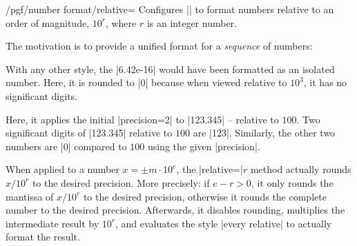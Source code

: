 \begin{keylist}{/pgf/number format/relative=}
	Configures |\pgfmathprintnumber| to format numbers relative to an order of magnitude, $10^r$, where $r$ is an integer number.

	The motivation is to provide a unified format for a \emph{sequence} of numbers:
\begin{codeexample}[]
\hspace{1em}
\hspace{1em}
\hspace{1em}
\hspace{1em}
\end{codeexample}
	\noindent With any other style, the |6.42e-16| would have been formatted as an isolated number. Here, it is rounded to |0| because when viewed relative to $10^3$, it has no significant digits.

\begin{codeexample}[]
\hspace{1em}
\hspace{1em}
\hspace{1em}
\end{codeexample}
	Here, it applies the initial |precision=2| to |123.345| -- relative to $100$. Two significant digits of |123.345| relative to $100$ are |123|. Similarly, the other two numbers are |0| compared to $100$ using the given |precision|.


\begin{codeexample}[]
\hspace{1em}
\hspace{1em}
\hspace{1em}
\end{codeexample}


	When applied to a number $x = \pm m \cdot 10^e$, the |relative=|$r$ method actually rounds $x / 10^r$ to the desired precision. More precisely: if $e-r>0$, it only rounds the mantissa of $x/10^r$ to the desired precision, otherwise it rounds the complete number to the desired precision. Afterwards, it disables rounding, multiplies the intermediate result by $10^r$, and evaluates the style |every relative| to actually format the result.
\end{keylist}
